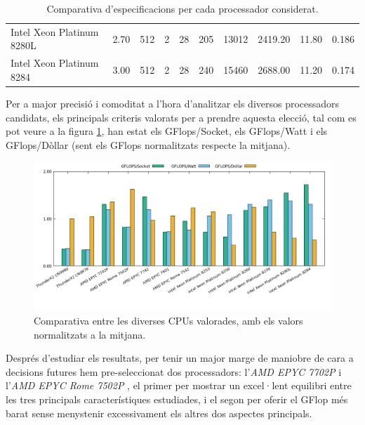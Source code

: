 \begin{table}[H]
\begin{adjustwidth}{-1.0in}{-1.0in}
\begin{center}
{\begin{tabular}{l||c|c|c|c|c|c|c|c|c}
Intel Xeon Platinum 8280L & 2.70       & 512                                                       & 2                                                        & 28    & 205   & 13012      & 2419.20       & 11.80       & 0.186         \\
\rowcolor[HTML]{EFEFEF} 
Intel Xeon Platinum 8284  & 3.00       & 512                                                       & 2                                                        & 28    & 240   & 15460      & 2688.00       & 11.20       & 0.174         \\ \hline 
\end{tabular}
}
    \caption{Comparativa d'especificacions per cada processador considerat.}
    \label{tab:cpu_cmp}
    \end{center}
    \end{adjustwidth}
\end{table}

Per a major precisió i comoditat a l'hora d'analitzar els diversos processadors candidats, els principals criteris valorats per a prendre aquesta elecció, tal com es pot veure a la figura \ref{chartCPUs}, han estat els GFlops/Socket, els GFlops/Watt i els GFlops/Dòllar (sent els GFlops normalitzats respecte la mitjana). 

\begin{figure}[H]
    \centering
    \includegraphics[width=\textwidth]{img/normalized_cpu}
    \caption{Comparativa entre les diverses CPUs valorades, amb els valors normalitzats a la mitjana.}
    \label{chartCPUs}
\end{figure}

Després d'estudiar els resultats, per tenir un major marge de maniobre de cara a decisions futures hem pre-seleccionat dos processadors: l'\textit{AMD EPYC 7702P} \cite{cpu_amd_7702_buy} i l'\textit{AMD EPYC Rome 7502P} \cite{cpu_amd_7502_buy}, el primer per mostrar un excel·lent equilibri entre les tres principals característiques estudiades, i el segon per oferir el GFlop més barat sense menystenir excessivament els altres dos aspectes principals.
